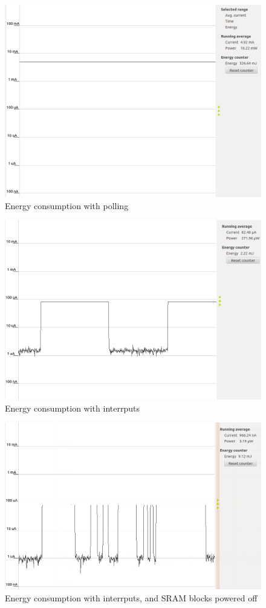 \begin{figure}[ht]
 \centering
 \includegraphics[width=\textwidth]{images/performance_with_polling.png}
 \caption{Energy consumption with polling}
 \label{fig:PerformancePolling}
\end{figure}

\begin{figure}[ht]
 \centering
 \includegraphics[width=\textwidth]{images/performance_with_interrputs.png}
 \caption{Energy consumption with interrputs}
 \label{fig:PerformanceInterrupts}
\end{figure}

\begin{figure}[ht]
 \centering
 \includegraphics[width=\textwidth]{images/performance_interrupts_sram_idle.png}
 \caption{Energy consumption with interrputs, and SRAM blocks powered off}
 \label{fig:PerformanceSRAM}
\end{figure}

